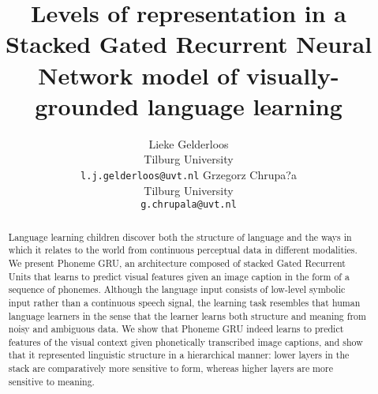 \documentclass[11pt,letterpaper]{article}
\title{Levels of representation in a Stacked Gated Recurrent Neural
  Network model of visually-grounded language learning}
\author{Lieke Gelderloos \\
  Tilburg University \\
  {\tt l.j.gelderloos@uvt.nl} \And
  Grzegorz Chrupa?a \\
  Tilburg University \\
  {\tt g.chrupala@uvt.nl} }
\date{}
\begin{document}
\maketitle
\begin{abstract}
Language learning children discover both the structure of language and the ways in which it relates to the world from continuous perceptual data in different modalities. We present {Phoneme GRU}, an architecture composed of stacked Gated Recurrent Units that learns to predict visual features given an image caption in the form of a sequence of phonemes. Although the language input consists of low-level symbolic input rather than a continuous speech signal, the learning task resembles that human language learners in the sense that the learner learns both structure and meaning from noisy and ambiguous data. We show that {\sc Phoneme GRU} indeed learns to predict features of the visual context given phonetically transcribed image captions, and show that it represented linguistic structure in a hierarchical manner: lower layers in the stack are comparatively more sensitive to form, whereas higher layers are more sensitive to meaning.

\end{abstract}











\end{document}
